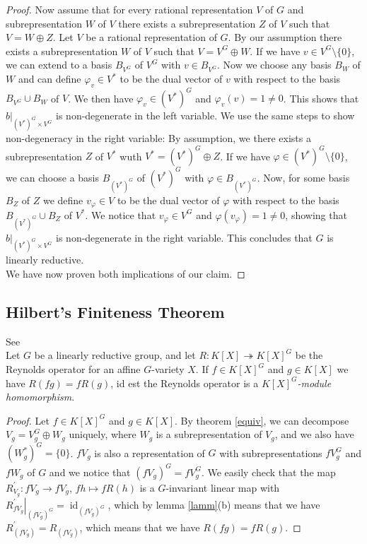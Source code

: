 \begin{proof}
  Now assume that for every rational representation $V$ of $G$ and subrepresentation $W$ of $V$ there exists a subrepresentation $Z$ of $V$ such that $V = W \oplus Z$.
  Let $V$ be a rational representation of $G$.
  By our assumption there exists a subrepresentation $W$ of $V$ such that $V = V^G \oplus W$.
  If we have $v \in V^G \setminus \{0\}$, we can extend to a basis $B_{V^G}$ of $V^G$ with $v \in B_{V^G}$.
  Now we choose any basis $B_W$ of $W$ and can define $\varphi_v \in V^\ast$ to be the dual vector of $v$ with respect to the basis $B_{V^G} \cup B_W$ of $V$.
  We then have $\varphi_v \in (V^\ast)^G $ and $\varphi_v (v) = 1 \neq 0$.
  This shows that $\left. b\right|_{(V^\ast)^G \times V^G}$ is non-degenerate in the left variable.
  We use the same steps to show non-degeneracy in the right variable:
  By assumption, we there exists a subrepresentation $Z$ of $V^\ast$ wuth $V^\ast = (V^\ast)^G \oplus Z$.
  If we have $\varphi \in (V^\ast)^G \setminus\{0\}$, we can choose a basis $B_{(V^\ast)^G}$ of $(V^\ast)^G$ with $\varphi \in B_{(V^\ast)^G}$.
  Now, for some basis $B_Z$ of $Z$ we define $v_\varphi \in V$ to be the dual vector of $\varphi$ with respect to the basis $B_{(V^\ast)^G}\cup B_Z$ of $V^\ast$.
  We notice that $v_\varphi \in V^G$ and $\varphi(v_\varphi) = 1 \neq 0$, showing that $\left. b\right|_{(V^\ast)^G \times V^G}$ is non-degenerate in the right variable.
  This concludes that $G$ is linearly reductive.\\
  We have now proven both implications of our claim.
\end{proof}

\subsection{Hilbert's Finiteness Theorem}

\begin{proposition}
  See \cite[p.41 Corollary 2.2.7]{DK15}\\
  Let $G$ be a linearly reductive group, and let $ R \colon K[X] \twoheadrightarrow K[X]^G $ be the Reynolds operator for an affine $G$-variety $X$.
  If $f \in K[X]^G$ and $g \in K[X]$ we have $R(fg) = fR(g)$, id est the Reynolds operator is a \textit{$K[X]^G$-module homomorphism}.
\end{proposition}

\begin{proof}
  Let $f \in K[X]^G$ and $g \in K[X]$.
  By theorem \ref{equiv}, we can decompose $V_g = V_g^G \oplus W_g$ uniquely, where $W_g$ is a subrepresentation of $V_g$, and we also have $(W_g^\ast)^G = \{0\}$.
  $fV_g$ is also a representation of $G$ with subrepresentations $fV_g^G$ and $fW_g$ of $G$ and we notice that $(fV_g)^G = fV_g^G$.
  We easily check that the map $R_{V_g}^\prime \colon fV_g \longrightarrow fV_g$, $fh \mapsto f R(h)$ is a $G$-invariant linear map with $\left. R_{fV_g}^\prime \right|_{(fV_g)^G} = \operatorname{id}_{(fV_g)^G}$, which by lemma \ref{lamm}(b) means that we have $R_{(fV_g)}^\prime = R_{(fV_g)}$, which means that we have $R(fg) = fR(g)$.
\end{proof}

